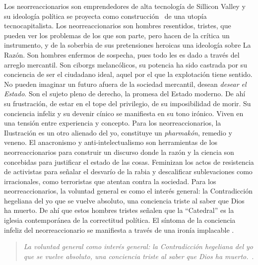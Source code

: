 Los neorreaccionarios son emprendedores de alta tecnología de Sillicon Valley y su ideología política se proyecta como construcción~ de una utopía tecnocapitalista. Los neorreaccionarios son hombres resentidos, tristes, que pueden ver los problemas de los que son parte, pero hacen de la crítica un instrumento, y de la soberbia de sus pretensiones heroicas una ideología sobre La Razón. Son hombres enfermos de sospecha, pues todo les es dado a través del arreglo mercantil. Son ciborgs melancólicos, su potencia ha sido castrada por su conciencia de ser el ciudadano ideal, aquel por el que la explotación tiene sentido. No pueden imaginar un futuro afuera de la sociedad mercantil, desean \emph{desear el Estado}. Son el sujeto pleno de derecho, la promesa del Estado moderno. De ahí su frustración, de estar en el tope del privilegio, de su imposibilidad de morir. Su conciencia infeliz y su devenir cínico se manifiesta en su tono irónico. Viven en una tensión entre experiencia y concepto. Para los neorreaccionarios, la Ilustración es un otro alienado del yo, constituye un \emph{pharmakón}, remedio y veneno. El anacronismo y anti-intelectualismo son herramientas de los neorreaccionarios para construir un discurso donde la razón y la ciencia son concebidas para justificar el estado de las cosas. Feminizan los actos de resistencia de activistas para señalar el desvarío de la rabia y descalificar sublevaciones como irracionales, como terroristas que atentan contra la sociedad. Para los neorreaccionarios, la voluntad general es como el interés general: la Contradicción hegeliana del yo que se vuelve absoluto, una conciencia triste al saber que Dios ha muerto. De ahí que estos hombres tristes señalen que la \enquote{Catedral} es la iglesia contemporánea de la correctitud política. El síntoma de la conciencia infeliz del neorreaccionario se manifiesta a través de una ironía implacable \autocite{huiUnhappyConsciousnessNeoreactionaries2017}.

\begin{quote}
  \emph{La voluntad general como interés general: la Contradicción hegeliana del yo que se vuelve absoluto, una conciencia triste al saber que Dios ha muerto.}~\autocite{huiUnhappyConsciousnessNeoreactionaries2017}.
\end{quote}

